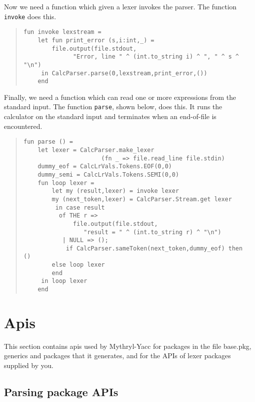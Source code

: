Now we need a function which given a lexer invokes the parser.  The
function {\tt invoke} does this.

\begin{quote}
\begin{verbatim}
fun invoke lexstream =
    let fun print_error (s,i:int,_) =
	    file.output(file.stdout,
			  "Error, line " ^ (int.to_string i) ^ ", " ^ s ^ "\n")
     in CalcParser.parse(0,lexstream,print_error,())
    end
\end{verbatim}
\end{quote}

Finally, we need a function which can read one or more expressions from
the standard input.  The function {\tt parse}, shown below, does this.
It runs the calculator on the standard input and terminates 
when an end-of-file is encountered.

\begin{quote}
\begin{verbatim}
fun parse () = 
    let lexer = CalcParser.make_lexer
                      (fn _ => file.read_line file.stdin)
	dummy_eof = CalcLrVals.Tokens.EOF(0,0)
	dummy_semi = CalcLrVals.Tokens.SEMI(0,0)
	fun loop lexer =
	    let my (result,lexer) = invoke lexer
		my (next_token,lexer) = CalcParser.Stream.get lexer
	     in case result
		  of THE r =>
		      file.output(file.stdout,
			     "result = " ^ (int.to_string r) ^ "\n")
		   | NULL => ();
	        if CalcParser.sameToken(next_token,dummy_eof) then ()
		else loop lexer
	    end
     in loop lexer
    end
\end{verbatim}
\end{quote}

\section{Apis}

This section contains apis used by Mythryl-Yacc for packages in
the file base.pkg, generics and packages that it generates, and for
the APIs of lexer packages supplied by you.

\subsection{Parsing package APIs}

